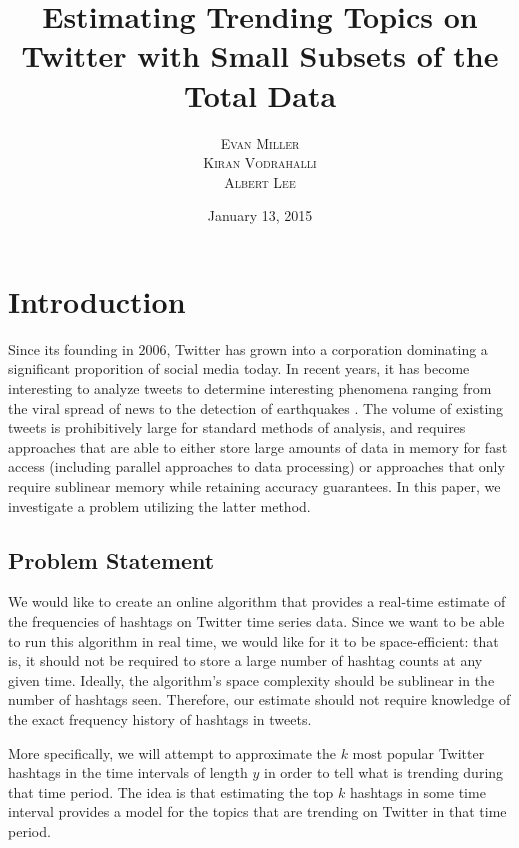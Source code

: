 \documentclass[twoside]{article}
\title{\vspace{-15mm}\fontsize{24pt}{10pt}\selectfont\textbf{Estimating Trending Topics on Twitter with Small Subsets of the Total Data}} %
\author{
\large
\textsc{Evan Miller}\\[2mm] 
\textsc{Kiran Vodrahalli}\\[2mm]
\textsc{Albert Lee}\\[2mm]
\vspace{-5mm}
}
\date{January 13, 2015}
\newcommand{\cc}[1]
 {\textbf{\cite{#1}}}
\begin{document}
\maketitle %

\small{

\section{Introduction} \label{sec:Intro}

Since its founding in $2006$, Twitter has grown into a corporation dominating a significant
proporition of social media today. In recent years, it has become interesting to analyze tweets
to determine interesting phenomena ranging from the viral spread of news to the detection of earthquakes \cc{Burks:2014}. The volume of existing tweets is prohibitively large for standard methods of analysis, and requires approaches that are able to either store large amounts of data in memory for fast access (including parallel approaches to data processing) or approaches that only require sublinear memory while retaining accuracy guarantees. In this paper, we investigate a problem utilizing the latter method. 

\subsection{Problem Statement} 

We would like to create an online algorithm that provides a real-time estimate of the frequencies of hashtags on Twitter time series data.
Since we want to be able to run this algorithm in real time, we would like for it to be space-efficient: that is, it should not be required to store a large number of hashtag counts at any given time. Ideally, the algorithm's space complexity should be sublinear in the number of hashtags seen. 
Therefore, our estimate should not require knowledge of the exact frequency history of hashtags in tweets. 

More specifically, we will attempt to approximate the $k$ most popular Twitter hashtags in the time intervals of length $y$ in order to tell what is trending during that time period.
The idea is that estimating the top $k$ hashtags in some time interval provides a model for the topics that are trending on Twitter in that time period.


}
\end{document}
